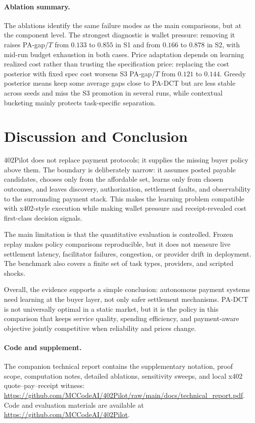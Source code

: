\documentclass[sigconf, nonacm]{acmart}
\DeclareRobustCommand{\padct}{PA\nobreakdash-DCT}
\begin{document}
\paragraph{Ablation summary.}
The ablations identify the same failure modes as the main comparisons, but at the component level. The strongest diagnostic is wallet pressure: removing it raises PA-gap/$T$ from $0.133$ to $0.855$ in S1 and from $0.166$ to $0.878$ in S2, with mid-run budget exhaustion in both cases. Price adaptation depends on learning realized cost rather than trusting the specification price: replacing the cost posterior with fixed spec cost worsens S3 PA-gap/$T$ from $0.121$ to $0.144$. Greedy posterior means keep some average gaps close to \padct{} but are less stable across seeds and miss the S3 promotion in several runs, while contextual bucketing mainly protects task-specific separation.

\section{Discussion and Conclusion}
\label{sec:discussion}

402Pilot does not replace payment protocols; it supplies the missing buyer policy above them. The boundary is deliberately narrow: it assumes posted payable candidates, chooses only from the affordable set, learns only from chosen outcomes, and leaves discovery, authorization, settlement faults, and observability to the surrounding payment stack. This makes the learning problem compatible with x402-style execution while making wallet pressure and receipt-revealed cost first-class decision signals.

The main limitation is that the quantitative evaluation is controlled. Frozen replay makes policy comparisons reproducible, but it does not measure live settlement latency, facilitator failures, congestion, or provider drift in deployment. The benchmark also covers a finite set of task types, providers, and scripted shocks.

Overall, the evidence supports a simple conclusion: autonomous payment systems need learning at the buyer layer, not only safer settlement mechanisms. \padct{} is not universally optimal in a static market, but it is the policy in this comparison that keeps service quality, spending efficiency, and payment-aware objective jointly competitive when reliability and prices change.

\paragraph{Code and supplement.}
The companion technical report contains the supplementary notation, proof scope, computation notes, detailed ablations, sensitivity sweeps, and local x402 quote--pay--receipt witness:
\url{https://github.com/MCCodeAI/402Pilot/raw/main/docs/technical_report.pdf}.
Code and evaluation materials are available at \url{https://github.com/MCCodeAI/402Pilot}.
\end{document}
